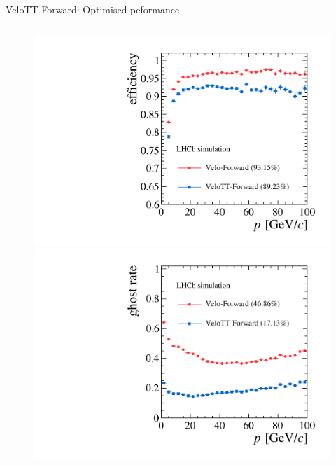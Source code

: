 \documentclass[aspectratio=1610]{beamer}
\begin{document}
\begin{frame}{VeloTT-Forward: Optimised peformance}
\begin{columns}
\begin{column}{0.35\textwidth}
\centering
\begin{figure}
\vspace*{-1cm}
\includegraphics[height=0.475\textheight]{figs/upstream-tracking-run2/Forward-eff-p.pdf}\\
\includegraphics[height=0.475\textheight]{figs/upstream-tracking-run2/Forward-gr-p.pdf}
\end{figure}
\end{column}
\end{columns}

\end{frame}

\end{document}
